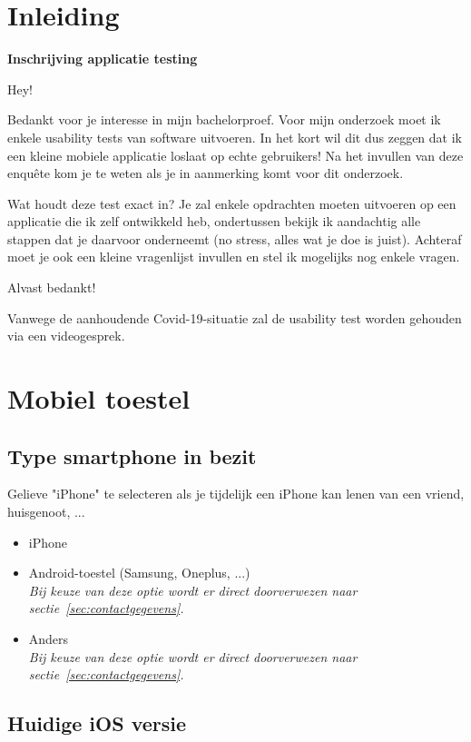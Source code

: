\section{Inleiding}

\textbf{Inschrijving applicatie testing}

Hey!

Bedankt voor je interesse in mijn bachelorproef. Voor mijn onderzoek moet ik enkele usability tests van software uitvoeren. In het kort wil dit dus zeggen dat ik een kleine mobiele applicatie loslaat op echte gebruikers! Na het invullen van deze enquête kom je te weten als je in aanmerking komt voor dit onderzoek.

Wat houdt deze test exact in? Je zal enkele opdrachten moeten uitvoeren op een applicatie die ik zelf ontwikkeld heb, ondertussen bekijk ik aandachtig alle stappen dat je daarvoor onderneemt (no stress, alles wat je doe is juist). Achteraf moet je ook een kleine vragenlijst invullen en stel ik mogelijks nog enkele vragen.

Alvast bedankt!

Vanwege de aanhoudende Covid-19-situatie zal de usability test worden gehouden via een videogesprek.

\section{Mobiel toestel}

\subsection*{Type smartphone in bezit}

Gelieve "iPhone" te selecteren als je tijdelijk een iPhone kan lenen van een vriend, huisgenoot, ...

\begin{itemize}
    \item iPhone
    \item Android-toestel (Samsung, Oneplus, ...) \\ \textit{Bij keuze van deze optie wordt er direct doorverwezen naar sectie~\ref{sec:contactgegevens}.}
    \item Anders \\ \textit{Bij keuze van deze optie wordt er direct doorverwezen naar sectie~\ref{sec:contactgegevens}.}
\end{itemize}

\subsection*{Huidige iOS versie}

